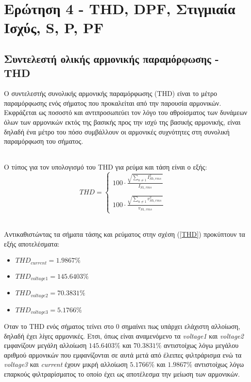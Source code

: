 \section*{Ερώτηση 4 - THD, DPF, Στιγμιαία Ισχύς, S, P, PF}
\label{ex4}

\subsection*{Συντελεστή ολικής αρμονικής παραμόρφωσης - THD}
\label{ex4q1}

Ο συντελεστής συνολικής αρμονικής παραμόρφωσης (THD) είναι το μέτρο παραμόρφωσης ενός σήματος που προκαλείται από την παρουσία αρμονικών. Εκφράζεται ως ποσοστό και αντιπροσωπεύει τον λόγο του αθροίσματος των δυνάμεων όλων των αρμονικών εκτός της βασικής προς την ισχύ της βασικής αρμονικής, είναι δηλαδή ένα μέτρο του πόσο συμβάλλουν οι αρμονικές συχνότητες στη συνολική παραμόρφωση του σήματος. 

\noindent\\
Ο τύπος για τον υπολογισμό του THD για ρεύμα και τάση είναι ο εξής: 
\begin{equation}
    THD = \left\{ \begin{array}{l}
                    100\cdot\frac{\sqrt{\sum _{n\neq1}^{ }I^2_{Sh,rms}\:}}{I_{S1,rms}}
                    \\
                    \\
                    100\cdot\frac{\sqrt{\sum _{n\neq1}^{ }v^2_{Sh,rms}\:}}{v_{S1,rms}}
                \end{array}
          \right. \label{THD}
\quad                                                                              
\end{equation}

\noindent\\
Αντικαθιστώντας τα σήματα τάσης και ρεύματος στην σχέση (\ref{THD}) προκύπτουν τα εξής αποτελέσματα:	
\begin{itemize}
    \item $THD_{current} = 1.9867\%$
    \item $THD_{voltage1} = 145.6403\%$
    \item $THD_{voltage2} = 70.3831\%$
    \item $THD_{voltage3} = 5.1766\%$
\end{itemize}

\noindent
Οταν το THD ενός σήματος τείνει στο 0 σημαίνει πως υπάρχει ελάχιστη αλλοίωση, δηλαδή έχει λίγες αρμονικές. Ετσι, όπως είναι αναμενόμενο τα \textit{voltage1} και \textit{voltage2} εμφανίζουν μεγάλη αλλοίωση $145.6403\%$ και $70.3831\%$ αντιστοίχως λόγω μεγάλου αριθμού αρμονικών που εμφανίζονται σε αυτά μετά από έλειπες φιλτράρισμα ενώ τα \textit{voltage3} και \textit{current} έχουν μικρή αλλοίωση $5.1766\%$ και $1.9867\%$ αντιστοίχως λόγω επαρκούς φιλτραρίσματος το οποίο έχει ως αποτέλεσμα την μείωση των αρμονικών.
	
